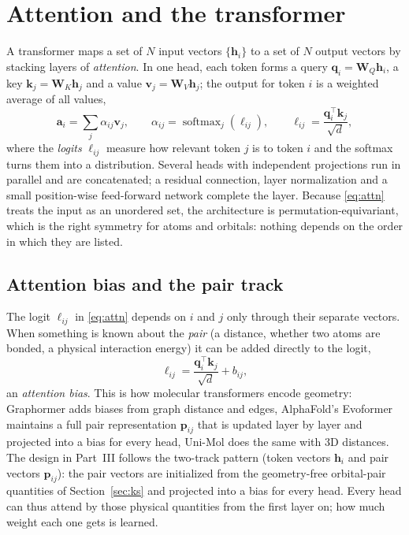 \documentclass[11pt,a4paper]{article}
\newcommand{\vb}[1]{\bm{#1}}
\newcommand{\softmax}{\operatorname{softmax}}
\newcommand{\set}[1]{\{#1\}}
\begin{document}
\section{Attention and the transformer}
\label{sec:attn}
A transformer \cite{vaswani} maps a set of $N$ input vectors $\set{\vb{h}_i}$ to a set of $N$ output vectors by stacking layers of \emph{attention}. In one head, each token forms a query $\vb{q}_i=\vb{W}_Q\vb{h}_i$, a key $\vb{k}_j=\vb{W}_K\vb{h}_j$ and a value $\vb{v}_j=\vb{W}_V\vb{h}_j$; the output for token $i$ is a weighted average of all values,
\begin{equation}
\vb{a}_i=\sum_j \alpha_{ij}\vb{v}_j,\qquad \alpha_{ij}=\softmax_j(\ell_{ij}),\qquad \ell_{ij}=\frac{\vb{q}_i^{\!\top}\vb{k}_j}{\sqrt{d}} ,
\label{eq:attn}
\end{equation}
where the \emph{logits} $\ell_{ij}$ measure how relevant token $j$ is to token $i$ and the softmax turns them into a distribution. Several heads with independent projections run in parallel and are concatenated; a residual connection, layer normalization and a small position-wise feed-forward network complete the layer. Because \eqref{eq:attn} treats the input as an unordered set, the architecture is permutation-equivariant, which is the right symmetry for atoms and orbitals: nothing depends on the order in which they are listed.

\subsection{Attention bias and the pair track}
The logit $\ell_{ij}$ in \eqref{eq:attn} depends on $i$ and $j$ only through their separate vectors. When something is known about the \emph{pair} (a distance, whether two atoms are bonded, a physical interaction energy) it can be added directly to the logit,
\begin{equation}
\ell_{ij}=\frac{\vb{q}_i^{\!\top}\vb{k}_j}{\sqrt{d}}+b_{ij},
\end{equation}
an \emph{attention bias}. This is how molecular transformers encode geometry: Graphormer \cite{graphormer} adds biases from graph distance and edges, AlphaFold's Evoformer \cite{alphafold} maintains a full pair representation $\vb{p}_{ij}$ that is updated layer by layer and projected into a bias for every head, Uni-Mol \cite{unimol} does the same with 3D distances. The design in Part~III follows the two-track pattern (token vectors $\vb{h}_i$ and pair vectors $\vb{p}_{ij}$): the pair vectors are initialized from the geometry-free orbital-pair quantities of Section~\ref{sec:ks} and projected into a bias for every head. Every head can thus attend by those physical quantities from the first layer on; how much weight each one gets is learned.
\end{document}
